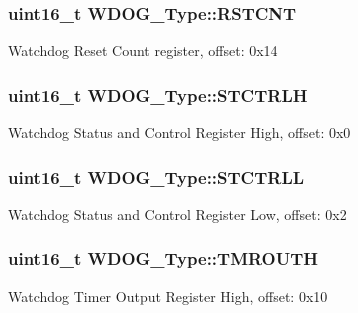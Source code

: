 \subsubsection[{\texorpdfstring{R\+S\+T\+C\+NT}{RSTCNT}}]{ uint16\+\_\+t W\+D\+O\+G\+\_\+\+Type\+::\+R\+S\+T\+C\+NT}\hypertarget{structWDOG__Type_a93f2183d7dd58677141d9d93cd7d09c3}{}\label{structWDOG__Type_a93f2183d7dd58677141d9d93cd7d09c3}
Watchdog Reset Count register, offset\+: 0x14 
\subsubsection[{\texorpdfstring{S\+T\+C\+T\+R\+LH}{STCTRLH}}]{ uint16\+\_\+t W\+D\+O\+G\+\_\+\+Type\+::\+S\+T\+C\+T\+R\+LH}\hypertarget{structWDOG__Type_a11f8029e735f8e5a5747eae9c4ab666c}{}\label{structWDOG__Type_a11f8029e735f8e5a5747eae9c4ab666c}
Watchdog Status and Control Register High, offset\+: 0x0 
\subsubsection[{\texorpdfstring{S\+T\+C\+T\+R\+LL}{STCTRLL}}]{ uint16\+\_\+t W\+D\+O\+G\+\_\+\+Type\+::\+S\+T\+C\+T\+R\+LL}\hypertarget{structWDOG__Type_a2c4f1d84d552c73603e6ecd7baae96c6}{}\label{structWDOG__Type_a2c4f1d84d552c73603e6ecd7baae96c6}
Watchdog Status and Control Register Low, offset\+: 0x2 
\subsubsection[{\texorpdfstring{T\+M\+R\+O\+U\+TH}{TMROUTH}}]{ uint16\+\_\+t W\+D\+O\+G\+\_\+\+Type\+::\+T\+M\+R\+O\+U\+TH}\hypertarget{structWDOG__Type_aeccf8f74411e12e6f188789a39dee264}{}\label{structWDOG__Type_aeccf8f74411e12e6f188789a39dee264}
Watchdog Timer Output Register High, offset\+: 0x10 
